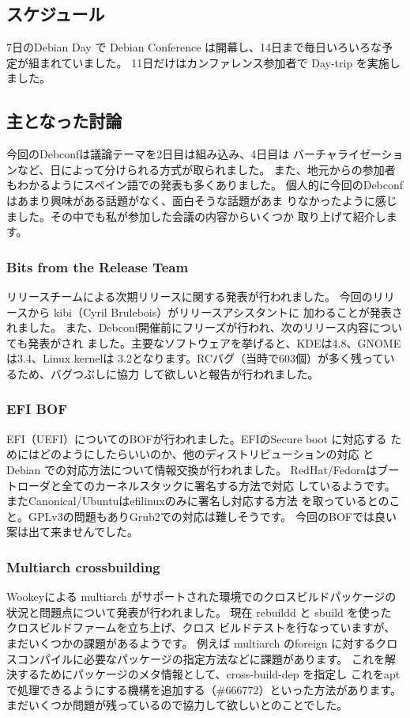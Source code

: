 \documentclass[mingoth,a4paper]{jsarticle}
\begin{document}
\subsection{スケジュール}

7日のDebian Day で Debian Conference は開幕し、14日まで毎日いろいろな予
定が組まれていました。
11日だけはカンファレンス参加者で Day-trip を実施しました。

\subsection{主となった討論}

今回のDebconfは議論テーマを2日目は組み込み、4日目は
バーチャライゼーションなど、日によって分けられる方式が取られました。
また、地元からの参加者もわかるようにスペイン語での発表も多くありました。
個人的に今回のDebconfはあまり興味がある話題がなく、面白そうな話題があま
りなかったように感じました。その中でも私が参加した会議の内容からいくつか
取り上げて紹介します。

\subsubsection{Bits from the Release Team}

リリースチームによる次期リリースに関する発表が行われました。
今回のリリースから kibi（Cyril Brulebois）がリリースアシスタントに
加わることが発表されました。
また、Debconf開催前にフリーズが行われ、次のリリース内容についても発表がされ
ました。主要なソフトウェアを挙げると、KDEは4.8、GNOMEは3.4、Linux kernelは
3.2となります。RCバグ（当時で603個）が多く残っているため、バグつぶしに協力
して欲しいと報告が行われました。

\subsubsection{EFI BOF}
EFI（UEFI）についてのBOFが行われました。EFIのSecure boot に対応する
ためにはどのようにしたらいいのか、他のディストリビューションの対応
とDebian での対応方法について情報交換が行われました。
RedHat/Fedoraはブートローダと全てのカーネルスタックに署名する方法で対応
しているようです。またCanonical/Ubuntuはefilinuxのみに署名し対応する方法
を取っているとのこと。GPLv3の問題もありGrub2での対応は難しそうです。
今回のBOFでは良い案は出て来ませんでした。

\subsubsection{Multiarch crossbuilding}
Wookeyによる multiarch がサポートされた環境でのクロスビルドパッケージの
状況と問題点について発表が行われました。
現在 rebuildd と sbuild を使った クロスビルドファームを立ち上げ、クロス
ビルドテストを行なっていますが、まだいくつかの課題があるようです。
例えば multiarch のforeign
に対するクロスコンパイルに必要なパッケージの指定方法などに課題があります。
これを解決するためにパッケージのメタ情報として、cross-build-dep を指定し
これをaptで処理できるようにする機構を追加する（\#666772）といった方法があります。まだいくつか問題が残っているので協力して欲しいとのことでした。
\end{document}
